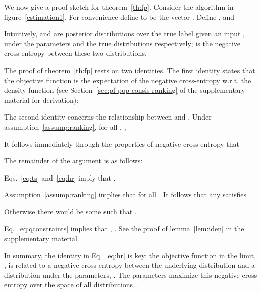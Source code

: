 \documentclass[11pt,a4paper]{article}
\newcommand{\commentout}[1]{}
\begin{document}
\commentout{
The input to the algorithm is a set  for  drawn from the distribution .
In addition for each training example we sample  ``negative''
examples  for .}

We now give a proof sketch for theorem~\ref{th:fp}.
Consider the algorithm in figure~\ref{estimation1}.
For convenience define
 to be the vector .
Define 
,
and

Intuitively,  and  are posterior
distributions over the true label  given an input ,
under the parameters  and the true distributions 
respectively;  is the negative cross-entropy
between these two distributions.

\commentout{
Thus  is a distribution under parameters ,
 is a distribution under the true underlying distribution,
and  is the negative cross entropy between these two
distributions.}

\commentout{
The proof of theorem~\ref{th:fp} rests on two identities.
Note that .
The first identity is as follows:
\begin{small}

\end{small}
Eq.~\ref{eq:ei1} follows because
each pair  is drawn from the distribution
. Eq.~\ref{eq:hr} follows through algebraic manipulations.
}


The proof of theorem~\ref{th:fp} rests on two identities. The first identity states that the objective function is the expectation of the negative cross-entropy w.r.t. the density function  (see Section~\ref{sec:pf-pop-consis-ranking} of the supplementary material for derivation):

The second identity concerns the relationship between 
and .  Under assumption~\ref{assump:ranking}, for all , ,

It follows immediately through the properties of negative cross entropy that






The remainder of the argument is as follows:


 Eqs.~\ref{eq:ts} and~\ref{eq:hr} imply that .

 Assumption~\ref{assump:ranking} implies that  for all . It follows that any 
satisfies

Otherwise there would be some  such that .

 Eq.~\ref{eq:qconstraints} implies that , . See the proof of lemma~\ref{lem:iden}
  in the supplementary material.


In summary, the identity in Eq.~\ref{eq:hr} is key: the objective
function in the limit, , is
related to a negative cross-entropy between the
underlying distribution  and a distribution
under the parameters, . The parameters 
maximize this negative cross entropy over the space of all
distributions . 
\end{document}
